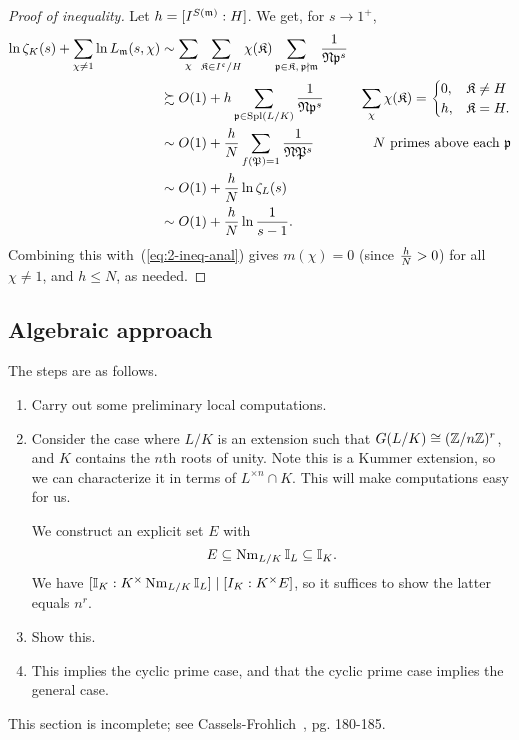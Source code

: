 \begin{proof}[Proof of inequality]
Let $h=[I^{S(\mathfrak{m})}:H]$. We get, for $s\to 1^+$,
\begin{align*}
\ln \zeta_K(s)+\sum_{\chi\ne 1}\ln L_{\mathfrak{m}}(s,\chi) &\sim\sum_{\chi}\sum_{\mathfrak K\in I^{\mathfrak{c}}/H}\chi(\mathfrak K)\sum_{\mathfrak{p}\in \mathfrak K,\,\mathfrak{p}\nmid \mathfrak{m}}\frac{1}{\mathfrak{N}\mathfrak{p}^s}\\
&\succsim O(1)+h\sum_{\mathfrak{p}\in \operatorname{Spl}(L/K)}\frac{1}{\mathfrak{N}\mathfrak{p}^s}
&\sum_{\chi}\chi(\mathfrak K)=\begin{cases}
0,&\mathfrak K\neq H\\
h,&\mathfrak K= H.
\end{cases}\\
&\sim O(1)+\frac{h}{N}\sum_{f(\mathfrak{P})=1}\frac{1}{\mathfrak{N}\mathfrak{P}^s}&\text{$N$ primes above each $\mathfrak{p}$}\\
&\sim O(1)+\frac{h}{N}\ln \zeta_L(s)\\
&\sim O(1)+\frac{h}{N} \ln \frac{1}{s-1}.
\end{align*}
Combining this with~(\ref{eq:2-ineq-anal}) gives $m(\chi)=0$ (since $\frac{h}{N}>0$) for all $\chi\ne 1$, and $h\le N$, as needed.
\end{proof}

\subsection{Algebraic approach}
The steps are as follows.
\begin{enumerate}
\item
Carry out some preliminary local computations.
\item
Consider the case where $L/K$ is an extension such that $G(L/K)\cong (\mathbb{Z}/n\mathbb{Z})^r$, and $K$ contains the $n$th roots of unity. %
Note this is a Kummer extension, so we can characterize it in terms of $L^{\times n}\cap K$. This will make computations easy for us. %

We construct an explicit set $E$ with
\[
E\subseteq \operatorname{Nm}_{L/K}\mathbb{I}_L\subseteq \mathbb{I}_K.
\]
We have $[\mathbb{I}_K:K^{\times}\operatorname{Nm}_{L/K}\mathbb{I}_L]\mid [I_K:K^{\times}E]$, so it suffices to show the latter equals $n^r$.
\item Show this.
\item This implies the cyclic prime case, and that the cyclic prime case implies the general case.
\end{enumerate}
This section is incomplete; see Cassels-Frohlich~\cite{CF69}, pg. 180-185.

